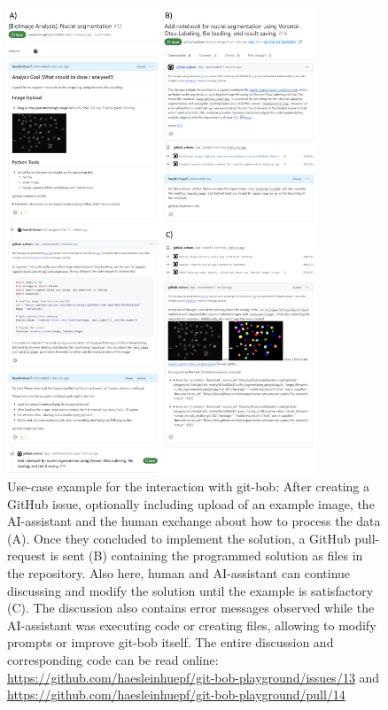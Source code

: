 \documentclass{ecai}
\begin{document}
\begin{figure}[h]
\centering
\includegraphics[width=0.82\textwidth]{example_interaction.png}
\caption{Use-case example for the interaction with git-bob: After creating a GitHub issue, optionally including upload of an example image, the AI-assistant and the human exchange about how to process the data (A). Once they concluded to implement the solution, a GitHub pull-request is sent (B) containing the programmed solution as files in the repository. Also here, human and AI-assistant can continue discussing and modify the solution until the example is satisfactory (C). The discussion also contains error messages observed while the AI-assistant was executing code or creating files, allowing to modify prompts or improve git-bob itself. The entire discussion and corresponding code can be read online: \url{https://github.com/haesleinhuepf/git-bob-playground/issues/13} and \url{https://github.com/haesleinhuepf/git-bob-playground/pull/14}
\newline
\newline
}
\label{fig:example_interaction}
\end{figure}
\end{document}
